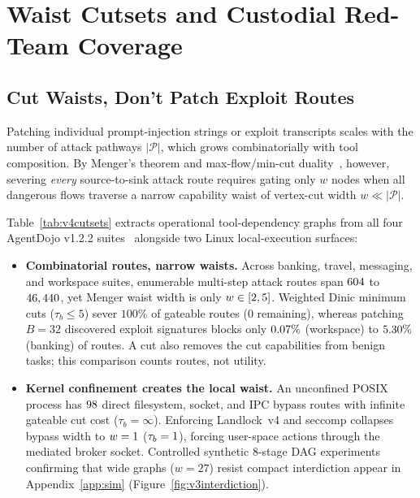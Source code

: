 \section{Waist Cutsets and Custodial Red-Team Coverage}\label{sec:width}

\subsection{Cut Waists, Don't Patch Exploit Routes}

Patching individual prompt-injection strings or exploit transcripts scales with the number of attack pathways \(|\mathcal{P}|\), which grows combinatorially with tool composition. By Menger's theorem and max-flow/min-cut duality~\cite{menger,robacker,lovasz,dinic1970}, however, severing \emph{every} source-to-sink attack route requires gating only \(w\) nodes when all dangerous flows traverse a narrow capability waist of vertex-cut width \(w \ll |\mathcal{P}|\).



Table~\ref{tab:v4cutsets} extracts operational tool-dependency graphs from all four AgentDojo v1.2.2 suites~\cite{agentdojo} alongside two Linux local-execution surfaces:
\begin{itemize}
  \item \textbf{Combinatorial routes, narrow waists.} Across banking, travel, messaging, and workspace suites, enumerable multi-step attack routes span \(604\) to \(46,440\), yet Menger waist width is only \(w \in [2, 5]\). Weighted Dinic minimum cuts (\(\tau_b \le 5\)) sever \(100\%\) of gateable routes (\(0\) remaining), whereas patching \(B = 32\) discovered exploit signatures blocks only \(0.07\%\) (workspace) to \(5.30\%\) (banking) of routes. A cut also removes the cut capabilities from benign tasks; this comparison counts routes, not utility.
  \item \textbf{Kernel confinement creates the local waist.} An unconfined POSIX process has \(98\) direct filesystem, socket, and IPC bypass routes with infinite gateable cut cost (\(\tau_b = \infty\)). Enforcing Landlock~v4 and seccomp collapses bypass width to \(w = 1\) (\(\tau_b = 1\)), forcing user-space actions through the mediated broker socket. Controlled synthetic 8-stage DAG experiments confirming that wide graphs (\(w = 27\)) resist compact interdiction appear in Appendix~\ref{app:sim} (Figure~\ref{fig:v3interdiction}).
\end{itemize}

